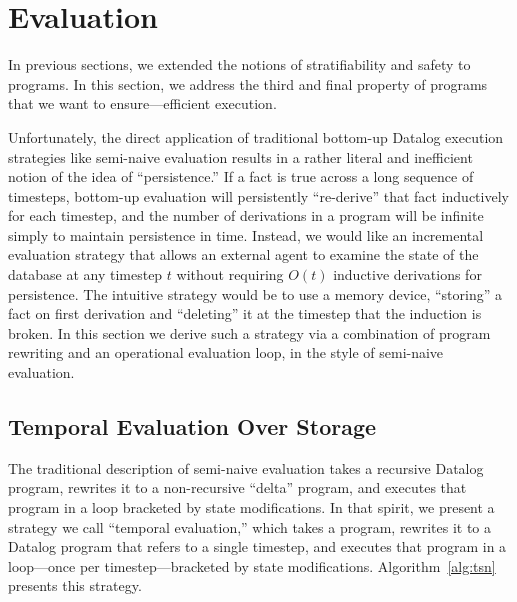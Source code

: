 \section{Evaluation}
\label{sec:eval}
In previous sections, we extended the notions of stratifiability and safety to \slang programs.  In this section, we address the third and final property of \slang programs that we want to ensure---efficient execution.

Unfortunately, the direct application of traditional bottom-up Datalog
execution strategies like semi-naive evaluation results in a rather literal and
inefficient notion of the idea of ``persistence.''  If a fact is true across a
long sequence of timesteps, bottom-up evaluation will persistently
``re-derive'' that fact inductively for each timestep, and the number of
derivations in a program will be infinite simply to maintain persistence in
time.  Instead, we would like an incremental evaluation strategy that allows an
external agent to examine the state of the database at any timestep $t$ without
requiring $O(t)$ inductive derivations for persistence.  The intuitive strategy
would be to use a memory device, ``storing'' a fact on first derivation and
``deleting'' it at the timestep that the induction is broken.  In this section
we derive such a strategy via a combination of program rewriting and an
operational evaluation loop, in the style of semi-naive evaluation.

\subsection{Temporal Evaluation Over Storage}
The traditional description of semi-naive evaluation takes a recursive Datalog program, rewrites it to a non-recursive ``delta'' program, and executes that program in a loop bracketed by state modifications.  In that spirit, we present a strategy we call ``temporal evaluation,'' which takes a \slang program, rewrites it to a Datalog program that refers to a single timestep, and executes that program in a loop---once per timestep---bracketed by state modifications.  Algorithm~\ref{alg:tsn} presents this strategy.


